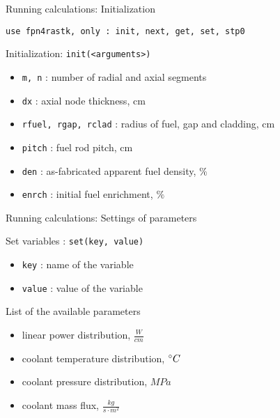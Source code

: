 \documentclass[11pt]{beamer}
\begin{document}
\begin{frame}{Running calculations: Initialization}
  
  \footnotesize

  \centering\texttt{use fpn4rastk, only : init, next, get, set, stp0}

  \begin{block}{Initialization: \texttt{init(<arguments>)}}
    \begin{itemize}
    \item \texttt{m, n} : number of radial and axial segments
    \item \texttt{dx} : axial node thickness, cm
    \item \texttt{rfuel, rgap, rclad} : radius of fuel, gap and cladding, cm
    \item \texttt{pitch} : fuel rod pitch, cm
    \item \texttt{den} : as-fabricated apparent fuel density, $\%$
    \item \texttt{enrch} : initial fuel enrichment, $\%$
    \end{itemize}
  \end{block}

\end{frame}



\begin{frame}{Running calculations: Settings of parameters}
  
  \footnotesize

  \begin{block}{Set variables : \texttt{set(key, value)}}
    \begin{itemize}
    \item \texttt{key} : name of the variable
    \item \texttt{value} : value of the variable    
    \end{itemize}
  \end{block}

  \begin{block}{List of the available parameters}
    \begin{itemize}
    \item linear power distribution, $\frac{W}{cm}$
    \item coolant temperature distribution, $\degree C$
    \item coolant pressure distribution, $MPa$
    \item coolant mass flux, $\frac{kg}{s \cdot m^2}$
    \end{itemize}
  \end{block}

\end{frame}
\end{document}
